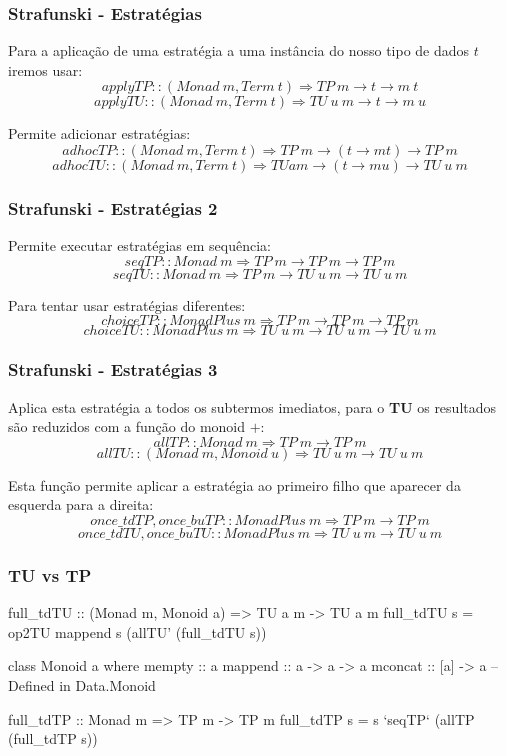 \documentclass{beamer}
\begin{document}
\begin{frame} \frametitle{Strafunski - Estratégias}
Para a aplicação de uma estratégia a uma instância do nosso tipo de dados $t$ iremos usar:
$$applyTP :: (Monad~m, Term~t) \Rightarrow TP~m \rightarrow t \rightarrow m~t$$
$$applyTU :: (Monad~m, Term~t) \Rightarrow TU~u~m \rightarrow t \rightarrow m~u$$

Permite adicionar estratégias:
$$adhocTP :: (Monad~m, Term~t) \Rightarrow TP~m \rightarrow (t \rightarrow m t) \rightarrow TP~m$$
$$adhocTU :: (Monad~m, Term~t) \Rightarrow TU a m \rightarrow (t \rightarrow m u) \rightarrow TU~u~m$$
\end{frame}

\begin{frame} \frametitle{Strafunski - Estratégias 2}
Permite executar estratégias em sequência:
$$seqTP :: Monad~m \Rightarrow TP~m \rightarrow TP~m \rightarrow TP~m$$
$$seqTU :: Monad~m \Rightarrow TP~m \rightarrow TU~u~m \rightarrow TU~u~m$$

Para tentar usar estratégias diferentes:
$$choiceTP :: MonadPlus~m \Rightarrow TP~m \rightarrow TP~m \rightarrow TP~m$$
$$choiceTU :: MonadPlus~m \Rightarrow TU~u~m \rightarrow TU~u~m \rightarrow TU~u~m$$
\end{frame}

\begin{frame} \frametitle{Strafunski - Estratégias 3}
Aplica esta estratégia a todos os subtermos imediatos, para o \textbf{TU} os resultados são reduzidos com a função do monoid $+$:
$$allTP :: Monad~m \Rightarrow TP~m \rightarrow TP~m$$
$$allTU :: (Monad~m, Monoid~u) \Rightarrow TU~u~m \rightarrow TU~u~m$$

Esta função permite aplicar a estratégia ao primeiro filho que aparecer da esquerda para a direita:
$$once\_tdTP,once\_buTP :: MonadPlus~m \Rightarrow TP~m \rightarrow TP~m$$
$$once\_tdTU, once\_buTU :: MonadPlus~m \Rightarrow TU~u~m \rightarrow TU~u~m$$
\end{frame}

\begin{frame}[fragile] \frametitle{TU vs TP}
\begin{haskell}
full_tdTU   :: (Monad m, Monoid a) => TU a m -> TU a m
full_tdTU s =  op2TU mappend s (allTU' (full_tdTU s))
\end{haskell}

\begin{haskell}
class Monoid a where
  mempty :: a
  mappend :: a -> a -> a
  mconcat :: [a] -> a
    -- Defined in Data.Monoid
\end{haskell}

\begin{haskell}
full_tdTP   :: Monad m => TP m -> TP m
full_tdTP s =  s `seqTP` (allTP (full_tdTP s))
\end{haskell}
\end{frame}
\end{document}
